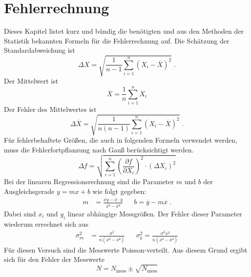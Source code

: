 \section{Fehlerrechnung}
Dieses Kapitel listet kurz und bündig die benötigten und aus den Methoden der Statistik bekannten Formeln für die Fehlerrechnung auf.
Die Schätzung der Standardabweichung ist
\begin{equation}
  \label{eq:std}
  \Delta X = \sqrt{\frac{1}{n-1}\sum_{i=1}^n(X_i-\overline{X})^2}     \; .
\end{equation}
Der Mittelwert ist
\begin{equation}
  \overline{X} = \frac{1}{n} \sum_{i=1}^nX_i
\end{equation}
Der Fehler des Mittelwertes ist
\begin{equation}
  \label{eq:std_mean}
  \Delta \overline{X} = \sqrt{\frac{1}{n(n-1)}\sum_{i=1}^n(X_i-\overline{X})^2}   \; .
\end{equation}
Für fehlerbehaftete Größen, die auch in folgenden Formeln verwendet werden, muss die Fehlerfortpflanzung nach Gauß berücksichtigt werden.
\begin{equation}
  \label{eq:GFFP}
  \Delta f = \sqrt{\sum_{i=1}^n \left(\frac{\partial f}{\partial X_i}\right)^2 \cdot (\Delta X_i)^2}
\end{equation}
Bei der linearen Regressionsrechnung sind die Parameter $m$ und $b$ der Ausgleichsgerade $y=mx+b$ wie folgt gegeben:
\begin{align}
  m &= \frac{\overline{xy}-\overline{x}\cdot\overline{y}}{\overline{x²} - \overline{x}²} & &  b = \overline{y} - m \overline{x}  \; .
\end{align}
Dabei sind $x_i$ und $y_i$ linear abhängige Messgrößen. Der Fehler dieser Parameter wiederum errechnet sich aus
\begin{align}
  \sigma_m^2 &= \frac{\sigma^2}{n(\overline{x²} - \overline{x}²)} & &\sigma_b^2 = \frac{\sigma^2\overline{x²}}{n(\overline{x²} - \overline{x}²)}
\end{align}
Für diesen Versuch sind die Messwerte Poisson-verteilt. Aus diesem Grund ergibt sich für den Fehler der Messwerte
\begin{equation}
  N = N_\text{mess} \pm \sqrt{N_\text{mess}}
  \label{eq:fehlerN}
\end{equation}
